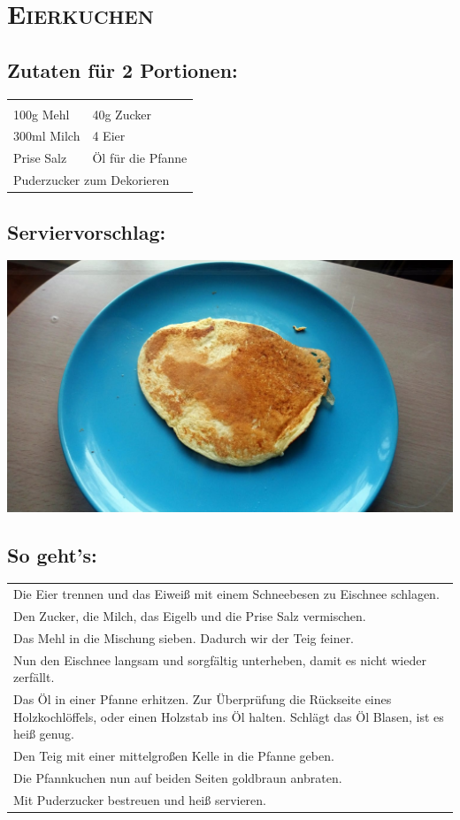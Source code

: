 \section{\textsc{Eierkuchen}}

\subsection*{Zutaten für 2 Portionen:}

\begin{tabular}{p{7.5cm} p{7.5cm}}
	& \\
	100g Mehl & 40g Zucker \\
	300ml Milch & 4 Eier \\
	Prise Salz & Öl für die Pfanne \\
	\multicolumn{2}{l}{Puderzucker zum Dekorieren}
\end{tabular}

\subsection*{Serviervorschlag:}

\includegraphics[width=\textwidth]{img/pancakes/pancakes_gebraten.jpg} \cite{pancakes}

\subsection*{So geht's:}

\begin{tabular}{p{15cm}}
	\\
	Die Eier trennen und das Eiweiß mit einem Schneebesen zu Eischnee schlagen.\\
	Den Zucker, die Milch, das Eigelb und die Prise Salz vermischen.\\
	Das Mehl in die Mischung sieben. Dadurch wir der Teig feiner.\\
	Nun den Eischnee langsam und sorgfältig unterheben, damit es nicht wieder zerfällt.\\
	Das Öl in einer Pfanne erhitzen. Zur Überprüfung die Rückseite eines Holzkochlöffels, oder einen Holzstab ins Öl halten. Schlägt das Öl Blasen, ist es heiß genug.\\
	Den Teig mit einer mittelgroßen Kelle in die Pfanne geben.\\
	Die Pfannkuchen nun auf beiden Seiten goldbraun anbraten.\\
	Mit Puderzucker bestreuen und heiß servieren.
\end{tabular}
